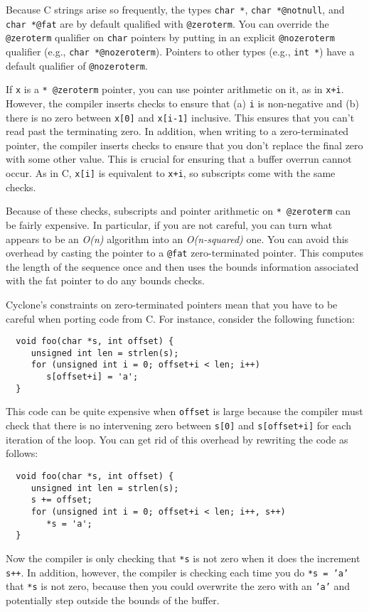 Because C strings arise so frequently, the types \texttt{char *},
\texttt{char *@notnull}, and \texttt{char *@fat} are by default
qualified with \texttt{@zeroterm}.  You can override the
\texttt{@zeroterm} qualifier on \texttt{char} pointers by putting in
an explicit \texttt{@nozeroterm} qualifier (e.g., \texttt{char
*@nozeroterm}).  Pointers to other types (e.g., \texttt{int *})
have a default qualifier of \texttt{@nozeroterm}.

If \texttt{x} is a \texttt{* @zeroterm} pointer, you can use pointer
arithmetic on it, as in \texttt{x+i}.  However, the compiler inserts
checks to ensure that (a) \texttt{i} is non-negative and (b) there is
no zero between \texttt{x[0]} and \texttt{x[i-1]} inclusive.  This
ensures that you can't read past the terminating zero.  In addition,
when writing to a zero-terminated pointer, the compiler inserts checks
to ensure that you don't replace the final zero with some other value.
This is crucial for ensuring that a buffer overrun cannot occur.
As in C, \texttt{x[i]} is equivalent to \texttt{x+i}, so subscripts
come with the same checks.

Because of these checks, subscripts and pointer arithmetic on
\texttt{* @zeroterm} can be fairly expensive.  In particular, if you
are not careful, you can turn what appears to be an \emph{O(n)}
algorithm into an \emph{O(n-squared)} one.  You can avoid this
overhead by casting the pointer to a \texttt{@fat} zero-terminated
pointer.  This computes the length of the sequence once and then uses
the bounds information associated with the fat pointer to do any
bounds checks.

Cyclone's constraints on zero-terminated pointers mean that you have
to be careful when porting code from C\@.  For instance, consider the
following function:
\begin{verbatim}
  void foo(char *s, int offset) {
     unsigned int len = strlen(s);
     for (unsigned int i = 0; offset+i < len; i++)
        s[offset+i] = 'a';
  }
\end{verbatim}
This code can be quite expensive when \texttt{offset} is large
because the compiler must check that there is no intervening
zero between \texttt{s[0]} and \texttt{s[offset+i]} for each
iteration of the loop.  You can get rid of this overhead by
rewriting the code as follows:
\begin{verbatim}
  void foo(char *s, int offset) {
     unsigned int len = strlen(s);
     s += offset;
     for (unsigned int i = 0; offset+i < len; i++, s++)
        *s = 'a';
  }
\end{verbatim}
Now the compiler is only checking that \texttt{*s} is not
zero when it does the increment \texttt{s++}.  In addition,
however, the compiler is checking each time you do \texttt{*s = 'a'}
that \texttt{*s} is not zero, because then you could overwrite
the zero with an \texttt{'a'} and potentially step outside
the bounds of the buffer. 

